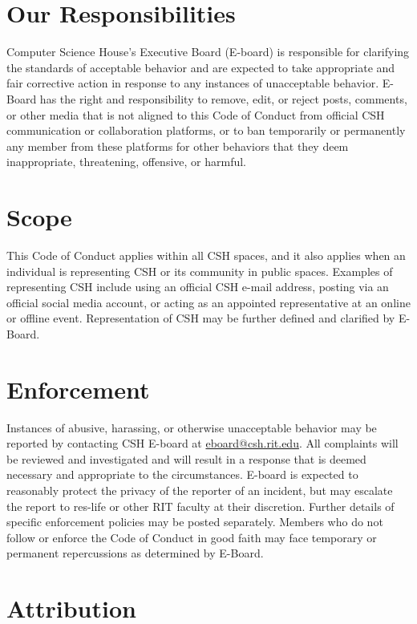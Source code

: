 \documentclass{article}
\begin{document}
\section*{Our Responsibilities}

Computer Science House’s Executive Board (E-board) is responsible for
clarifying the standards of acceptable behavior and are expected to take
appropriate and fair corrective action in response to any instances of
unacceptable behavior. E-Board has the right and responsibility to remove,
edit, or reject posts, comments, or other media that is not aligned to this
Code of Conduct from official CSH communication or collaboration platforms,
or to ban temporarily or permanently any member from these platforms for
other behaviors that they deem inappropriate, threatening, offensive, or
harmful.

\section*{Scope}

This Code of Conduct applies within all CSH spaces, and it also applies when
an individual is representing CSH or its community in public spaces. Examples
of representing CSH include using an official CSH e-mail address, posting via
an official social media account, or acting as an appointed representative at
an online or offline event. Representation of CSH may be further defined and
clarified by E-Board.

\section*{Enforcement}

Instances of abusive, harassing, or otherwise unacceptable behavior may be
reported by contacting CSH E-board at
\href{mailto:eboard@csh.rit.edu}{eboard@csh.rit.edu}. All complaints will
be reviewed and investigated and will result in a response that is deemed
necessary and appropriate to the circumstances. E-board is expected to
reasonably protect the privacy of the reporter of an incident, but may
escalate the report to res-life or other RIT faculty at their discretion.
Further details of specific enforcement policies may be posted separately.
Members who do not follow or enforce the Code of Conduct in good faith may
face temporary or permanent repercussions as determined by E-Board.

\section*{Attribution}
\end{document}
